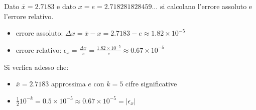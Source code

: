 \begin{center}
\footnotesize\noindent{}\end{center}

\noindent Dato \(\overline{x} = 2.7183\) e dato \(x = e = 2.718281828459\ldots \) si calcolano l'errore assoluto e l'errore relativo.

\begin{itemize}

\item errore assoluto: \(\Delta x = \overline{x} - x = 2.7183 - e \approx 1.82 \times 10^{-5}\)
\item errore relativo: \(\epsilon_x = \frac{\Delta x}{x} = \frac{ 1.82 \times 10^{-5}}{e} \approx 0.67 \times 10^{-5}\)

\end{itemize}

\noindent Si verfica adesso che:

\begin{itemize}
\item \(\overline{x} = 2.7183\) approssima \(e\) con \(k=5\) cifre significative
\item \( \frac{1}{2}10^{-k} = 0.5 \times 10^{-5} \approx 0.67 \times 10^{-5} = |\epsilon_x|\)
\end{itemize}
